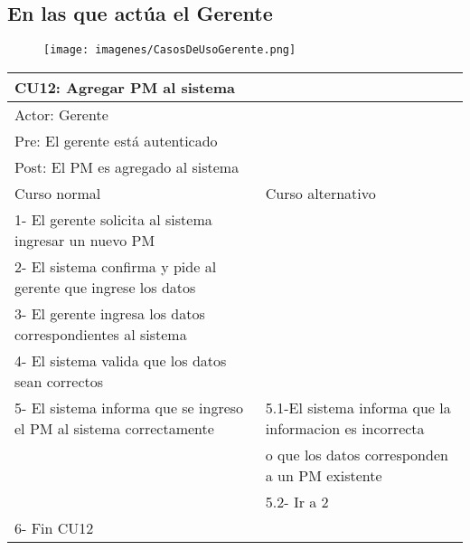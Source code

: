 \subsection{En las que actúa el Gerente}

\begin{figure}[H]
    \texttt{[image: imagenes/CasosDeUsoGerente.png]}
\end{figure}

\begin{table}[H]
  \begin{adjustbox}{max width = \textwidth}
  \begin{tabular}{|l|l|}
    \hline
    \multicolumn{2}{|l|}{CU12: Agregar PM al sistema} \\\hline
    \multicolumn{2}{|l|}{Actor: Gerente} \\\hline
    \multicolumn{2}{|l|}{Pre: El gerente está autenticado} \\\hline
    \multicolumn{2}{|l|}{Post: El PM es agregado al sistema} \\\hline
     Curso normal & Curso alternativo\\ \hline
	 1- El gerente solicita al sistema ingresar un nuevo PM & \\ \hline
     2- El sistema confirma y pide al gerente que ingrese los datos & \\ \hline
     3- El gerente ingresa los datos correspondientes al sistema & \\ \hline
     4- El sistema valida que los datos sean correctos & \\ \hline
     5- El sistema informa que se ingreso el PM al sistema correctamente & 5.1-El sistema informa que la informacion es incorrecta \\ & o que los datos corresponden a un PM existente  \\ & 5.2- Ir a 2 \\ \hline
     6- Fin CU12 & \\ \hline
  \end{tabular}
  \end{adjustbox}
\end{table}


